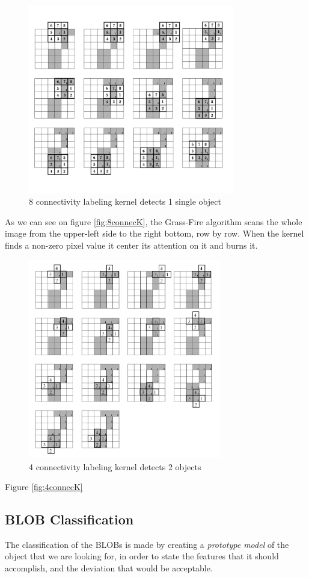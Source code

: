 \begin{figure}[htbp]
\centering
\includegraphics[width=0.8\textwidth]{Pictures/Theory/8connec_kernel.png}
\caption{8 connectivity labeling kernel detects 1 single object}
\label{fig:8connecK}
\end{figure}

As we can see on figure \eqref{fig:8connecK}, the Grass-Fire algorithm scans the whole image from the upper-left side to the right bottom, row by row. When the kernel finds a non-zero pixel value it center its attention on it and burns it.

\begin{figure}[htbp]
\centering
\includegraphics[width=0.75\textwidth]{Pictures/Theory/4connec_kernel.png}
\caption{4 connectivity labeling kernel detects 2 objects}
\label{fig:4connecK}
\end{figure}



Figure \eqref{fig:4connecK}

\subsection{BLOB Classification}
The classification of the BLOBs is made by creating a \textit{prototype model} of the object that we are looking for, in order to state the features that it should accomplish, and the deviation that would be acceptable.



